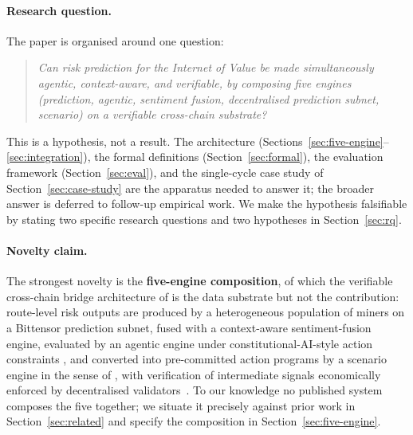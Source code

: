\documentclass[11pt,a4paper]{article}
\begin{document}
\paragraph{Research question.} The paper is organised around one question:
\begin{quote}
\emph{Can risk prediction for the Internet of Value be made simultaneously
agentic, context-aware, and verifiable, by composing five engines (prediction,
agentic, sentiment fusion, decentralised prediction subnet, scenario) on a
verifiable cross-chain substrate?}
\end{quote}
This is a hypothesis, not a result. The architecture
(Sections~\ref{sec:five-engine}--\ref{sec:integration}), the formal definitions
(Section~\ref{sec:formal}), the evaluation framework (Section~\ref{sec:eval}), and the
single-cycle case study of Section~\ref{sec:case-study} are the apparatus needed to
answer it; the broader answer is deferred to follow-up empirical work. We make the
hypothesis falsifiable by stating two specific research questions and two hypotheses in
Section~\ref{sec:rq}.

\paragraph{Novelty claim.} The strongest novelty is the \textbf{five-engine
composition}, of which the verifiable cross-chain bridge architecture of
\cite{augusto2024sok,zhang2023sok,wu2025safeguarding} is the data substrate but not the
contribution: route-level risk outputs are produced by a heterogeneous population of
miners on a Bittensor prediction subnet, fused with a context-aware sentiment-fusion
engine, evaluated by an agentic engine under constitutional-AI-style action constraints
\cite{bai2022constitutional}, and converted into pre-committed action programs by a
scenario engine in the sense of \cite{glasserman2003monte,nist2006sp80084}, with
verification of intermediate signals economically enforced by decentralised
validators~\cite{rao2021bittensor,steeves2022incentivizing,opentensor2024yuma}. To our
knowledge no published system composes the five together; we situate it precisely
against prior work in Section~\ref{sec:related} and specify the composition in
Section~\ref{sec:five-engine}.
\end{document}
